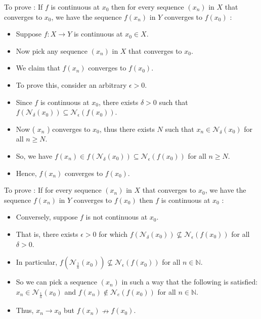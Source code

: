 \documentclass[12pt,a4paper]{article}
\begin{document}
To prove : If \(f\) is continuous at \(x_0\) then for every sequence \(\left(x_n\right)\) in \(X\) that converges to \(x_0\), we have the sequence \(f\left(x_n\right)\) in \(Y\) converges to \(f\left(x_0\right)\) :
\begin{itemize}
    \item Suppose \(f: X \rightarrow Y\) is continuous at \(x_0 \in X\).
    \item Now pick any sequence \(\left(x_n\right)\) in \(X\) that converges to \(x_0\).
    \item We claim that \(f\left(x_n\right)\) converges to \(f\left(x_0\right)\).
    \item To prove this, consider an arbitrary \(\epsilon>0\).
    \item Since \(f\) is continuous at \(x_0\), there exists \(\delta>0\) such that \(f\left(\mathcal{N}_\delta\left(x_0\right)\right) \subseteq \mathcal{N}_\epsilon\left(f\left(x_0\right)\right)\).
    \item Now ( \(x_n\) ) converges to \(x_0\), thus there exists \(N\) such that \(x_n \in \mathcal{N}_\delta\left(x_0\right)\) for all \(n \geq N\).
    \item So, we have \(f\left(x_n\right) \in f\left(\mathcal{N}_\delta\left(x_0\right)\right) \subseteq \mathcal{N}_\epsilon\left(f\left(x_0\right)\right)\) for all \(n \geq N\).
    \item Hence, \(f\left(x_n\right)\) converges to \(f\left(x_0\right)\).
\end{itemize}

To prove : If for every sequence \(\left(x_n\right)\) in \(X\) that converges to \(x_0\), we have the sequence \(f\left(x_n\right)\) in \(Y\) converges to \(f\left(x_0\right)\) then \(f\) is continuous at \(x_0\) :
\begin{itemize}
    \item Conversely, suppose \(f\) is not continuous at \(x_0\).
    \item That is, there exists \(\epsilon>0\) for which \(f\left(\mathcal{N}_\delta\left(x_0\right)\right) \nsubseteq \mathcal{N}_\epsilon\left(f\left(x_0\right)\right)\) for all \(\delta>0\).
    \item In particular, \(f\left(\mathcal{N}_{\frac{1}{n}}\left(x_0\right)\right) \nsubseteq \mathcal{N}_\epsilon\left(f\left(x_0\right)\right)\) for all \(n \in \mathbb{N}\).
    \item So we can pick a sequence \(\left(x_n\right)\) in such a way that the following is satisfied: \(x_n \in \mathcal{N}_{\frac{1}{n}}\left(x_0\right)\) and \(f\left(x_n\right) \notin \mathcal{N}_e\left(f\left(x_0\right)\right)\) for all \(n \in \mathbb{N}\).
    \item Thus, \(x_n \rightarrow x_0\) but \(f\left(x_n\right) \nrightarrow f\left(x_0\right)\).
\end{itemize}
\end{document}

